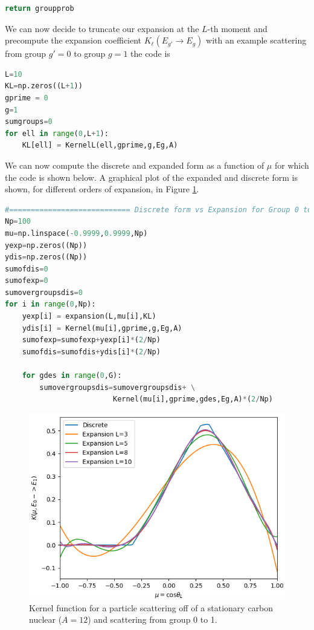 \documentclass[11pt,letterpaper,titlepage]{article}
\numberwithin{equation}{section}
\begin{document}
\begin{appendices}
\begin{lstlisting}[language=python]
    return groupprob
\end{lstlisting}

We can now decide to truncate our expansion at the $L$-th moment and precompute the expansion coefficient $K_\ell(E_{g'} {\to} E_g)$ with an example scattering from group $g'=0$ to group $g=1$ the code is

\begin{lstlisting}[language=python]
L=10
KL=np.zeros((L+1))
gprime = 0
g=1
sumgroups=0
for ell in range(0,L+1):
    KL[ell] = KernelL(ell,gprime,g,Eg,A)
\end{lstlisting}

We can now compute the discrete and expanded form as a function of $\mu$ for which the code is shown below. A graphical plot of the expanded and discrete form is shown, for different orders of expansion, in Figure  \ref{fig:kernelg0tog1}.
\newpage
\begin{lstlisting}[language=python]
#============================ Discrete form vs Expansion for Group 0 to 1        
Np=100
mu=np.linspace(-0.9999,0.9999,Np)
yexp=np.zeros((Np))
ydis=np.zeros((Np))
sumofdis=0
sumofexp=0
sumovergroupsdis=0
for i in range(0,Np):
    yexp[i] = expansion(L,mu[i],KL)
    ydis[i] = Kernel(mu[i],gprime,g,Eg,A)
    sumofexp=sumofexp+yexp[i]*(2/Np)
    sumofdis=sumofdis+ydis[i]*(2/Np)
    
    for gdes in range(0,G):
        sumovergroupsdis=sumovergroupsdis+ \
                         Kernel(mu[i],gprime,gdes,Eg,A)*(2/Np)
\end{lstlisting}

\begin{figure}[H]
\centering
\includegraphics[width=0.7\linewidth]{Figures/KernelG0toG1}
\caption{Kernel function for a particle scattering off of a stationary carbon nuclear ($A=12$) and scattering from group 0 to 1.}
\label{fig:kernelg0tog1}
\end{figure}





\end{appendices}
\end{document}
